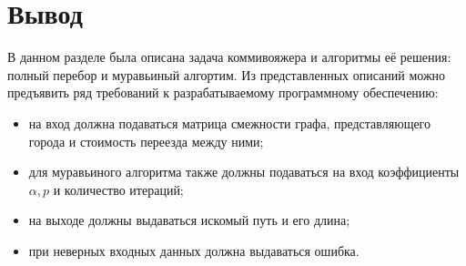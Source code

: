 \section{Вывод}

В данном разделе была описана задача коммивояжера и алгоритмы её решения:
полный перебор и муравьиный алгортим. Из представленных описаний можно
предъявить ряд требований к разрабатываемому программному обеспечению:
\begin{itemize}[left=\parindent]
    \item на вход должна подаваться матрица смежности графа, представляющего
        города и стоимость переезда между ними;
    \item для муравьиного алгоритма также должны подаваться на вход
        коэффициенты $\alpha, p$ и количество итераций;
    \item на выходе должны выдаваться искомый путь и его длина;
    \item при неверных входных данных должна выдаваться ошибка.
\end{itemize}
